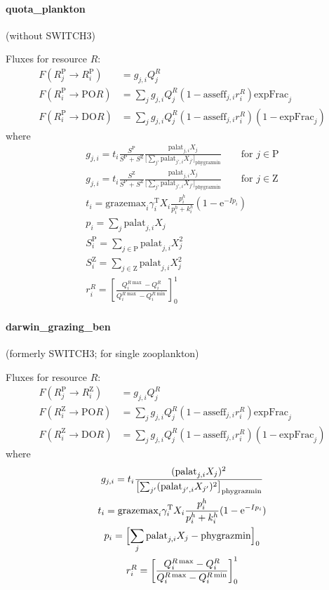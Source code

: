 \documentclass{article}
\def\ee{{\mathrm{e}}}
\def\|#1|{{\text{#1}}}
\begin{document}
\paragraph{quota\_plankton} (without SWITCH3)

\noindent
Fluxes for resource $R$:
\begin{align}
  F(R^{\|P|}_j \to R^{\|P|}_i)   &= g_{j,i} Q^R_j  \\
  F(R^{\|P|}_i \to \|PO|R)
    &= \sum_j g_{j,i} Q^R_j \left( 1 - \|asseff|_{j,i} r^R_i \right) \|expFrac|_j  \\
  F(R^{\|P|}_i \to \|DO|R)
    &= \sum_j g_{j,i} Q^R_j \left( 1 - \|asseff|_{j,i} r^R_i \right) (1 - \|expFrac|_j)
\end{align}
where
\begin{gather}
  g_{j,i} = t_i
                \frac{S^{\|P|}}{S^{\|P|}+S^{\|Z|}}
                \frac{\|palat|_{j,i} X_j}
                     {\bigl[\sum_{j'} \|palat|_{j',i} X_{j'}\bigr]_{\|phygrazmin|}}
  \qquad\text{for } j\in\|P|
\\
  g_{j,i} = t_i
                \frac{S^{\|Z|}}{S^{\|P|}+S^{\|Z|}}
                \frac{\|palat|_{j,i} X_j}
                     {\bigl[\sum_{j'} \|palat|_{j',i} X_{j'}\bigr]_{\|phygrazmin|}}
  \qquad\text{for } j\in\|Z|
\\
  t_i = \|grazemax|_i \gamma^{\|T|}_i X_i 
    \frac{p_i^h}{p_i^h+k^h_i}
    (1 - \ee^{-I p_i})
\\
  p_i = \sum_j \|palat|_{j,i} X_j
\\
  S^{\|P|}_i = \sum_{j\in\|P|} \|palat|_{j,i} X_j^2
\\
  S^{\|Z|}_i = \sum_{j\in\|Z|} \|palat|_{j,i} X_j^2
\\
  r^R_i = \left[ \frac{Q^{R\max}_i-Q^R_i}{Q^{R\max}_i-Q^{R\min}_i} \right]_0^1
\end{gather}


\paragraph{darwin\_grazing\_ben} (formerly SWITCH3; for single zooplankton)

\noindent
Fluxes for resource $R$:
\begin{align}
  F(R^{\|P|}_j \to R^{\|Z|}_i)   &= g_{j,i} Q^R_j  \\
  F(R^{\|Z|}_i \to \|PO|R)
    &= \sum_j g_{j,i} Q^R_j \left( 1 - \|asseff|_{j,i} r^R_i \right) \|expFrac|_j  \\
  F(R^{\|Z|}_i \to \|DO|R)
    &= \sum_j g_{j,i} Q^R_j \left( 1 - \|asseff|_{j,i} r^R_i \right) (1 - \|expFrac|_j)
\end{align}
where
\begin{gather}
  g_{j,i} = t_i \frac{(\|palat|_{j,i} X_j)^2}
                     {\bigl[\sum_{j'} (\|palat|_{j',i} X_{j'})^2\bigr]_{\|phygrazmin|}}
\\
  t_i = \|grazemax|_i \gamma^{\|T|}_i X_i 
    \frac{p_i^h}{p_i^h+k^h_i}
    (1 - \ee^{-I p_i})
\\
  p_i = \Bigl[ \sum_j \|palat|_{j,i} X_j - \|phygrazmin| \Bigr]_0
\\
  r^R_i = \left[ \frac{Q^{R\max}_i-Q^R_i}{Q^{R\max}_i-Q^{R\min}_i} \right]_0^1
\end{gather}
\end{document}
